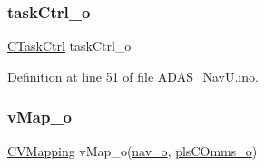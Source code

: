 \subsubsection{\texorpdfstring{task\+Ctrl\+\_\+o}{taskCtrl\_o}}
{\footnotesize\ttfamily \mbox{\hyperlink{class_c_task_ctrl}{C\+Task\+Ctrl}} task\+Ctrl\+\_\+o}



Definition at line 51 of file A\+D\+A\+S\+\_\+\+Nav\+U.\+ino.

\mbox{\label{_a_d_a_s___nav_u_8ino_a0c99773e7f5600fecea038efac852ddc}} 
\subsubsection{\texorpdfstring{v\+Map\+\_\+o}{vMap\_o}}
{\footnotesize\ttfamily \mbox{\hyperlink{class_c_v_mapping}{C\+V\+Mapping}} v\+Map\+\_\+o(\mbox{\hyperlink{_a_d_a_s___nav_u_8ino_a8abc3c3b0c6950fd83525420d5ca0dd2}{nav\+\_\+o}}, \mbox{\hyperlink{_a_d_a_s___nav_u_8ino_add0df3806d74ba741b1d6bc5452d7e79}{pls\+C\+Omms\+\_\+o}})}

